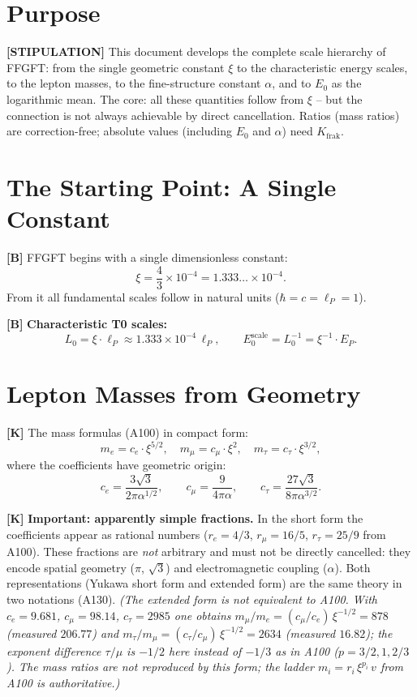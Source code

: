 \section{Purpose}

\textbf{[STIPULATION]} This document develops the complete scale hierarchy of FFGFT:
from the single geometric constant $\xi$ to the characteristic energy scales, to
the lepton masses, to the fine-structure constant $\alpha$, and to $E_0$ as the
logarithmic mean. The core: all these quantities follow from $\xi$ -- but the
connection is not always achievable by direct cancellation. Ratios (mass ratios) are correction-free; absolute values (including $E_0$ and $\alpha$) need $K_\text{frak}$.

\section{The Starting Point: A Single Constant}

\textbf{[B]} FFGFT begins with a single dimensionless constant:
\[
  \xi = \frac{4}{3}\times10^{-4} = 1{.}333\ldots\times10^{-4}.
\]
From it all fundamental scales follow in natural units ($\hbar=c=\ell_P=1$).

\textbf{[B]} \textbf{Characteristic T0 scales:}
\[
  L_0 = \xi\cdot\ell_P \approx 1{.}333\times10^{-4}\,\ell_P,
  \qquad
  E_0^\text{scale} = L_0^{-1} = \xi^{-1}\cdot E_P.
\]

\section{Lepton Masses from Geometry}

\textbf{[K]} The mass formulas (A100) in compact form:
\[
  m_e = c_e\cdot\xi^{5/2},
  \quad
  m_\mu = c_\mu\cdot\xi^2,
  \quad
  m_\tau = c_\tau\cdot\xi^{3/2},
\]
where the coefficients have geometric origin:
\[
  c_e = \frac{3\sqrt3}{2\pi\alpha^{1/2}},
  \qquad
  c_\mu = \frac{9}{4\pi\alpha},
  \qquad
  c_\tau = \frac{27\sqrt3}{8\pi\alpha^{3/2}}.
\]

\textbf{[K]} \textbf{Important: apparently simple fractions.} In the short form
the coefficients appear as rational numbers ($r_e=4/3$, $r_\mu=16/5$,
$r_\tau=25/9$ from A100). These fractions are \emph{not} arbitrary and must not
be directly cancelled: they encode spatial geometry ($\pi$, $\sqrt3$) and
electromagnetic coupling ($\alpha$). Both representations (Yukawa short form and
extended form) are the same theory in two notations (A130).
\textit{(The extended form is not equivalent to A100. With $c_e = 9.681$, $c_\mu = 98.14$, $c_\tau = 2985$ one obtains $m_\mu/m_e = (c_\mu/c_e)\,\xi^{-1/2} = 878$ (measured $206.77$) and $m_\tau/m_\mu = (c_\tau/c_\mu)\,\xi^{-1/2} = 2634$ (measured $16.82$); the exponent difference $\tau/\mu$ is $-1/2$ here instead of $-1/3$ as in A100 ($p = 3/2, 1, 2/3$). The mass ratios are not reproduced by this form; the ladder $m_i = r_i\,\xi^{p_i}\,v$ from A100 is authoritative.)}

